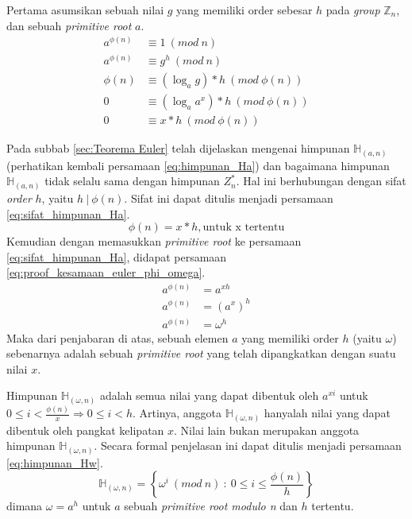 Pertama asumsikan sebuah nilai $ g $ yang memiliki order sebesar $ h $ pada \textit{group} $ \mathbb{Z}_n $, dan sebuah \textit{primitive root} $ a $.
\begin{align}
\label{eq:proof_order_modular_elemen_begin}
a^{\phi(n)} &\equiv 1\ (mod\ n)	\\
a^{\phi(n)} &\equiv g^h\ (mod\ n) \\
\phi(n) &\equiv (\log_a g) * h\ (mod\ \phi(n)) \\
0 &\equiv (\log_a {a^x}) * h\ (mod\ \phi(n)) \\
0 &\equiv x * h\ (mod\ \phi(n))
\label{eq:proof_order_modular_elemen}
\end{align}

Pada subbab \ref{sec:Teorema Euler} telah dijelaskan mengenai himpunan $ \mathbb{H}_{(a, n)} $ (perhatikan kembali persamaan \eqref{eq:himpunan_Ha}) dan bagaimana himpunan $ \mathbb{H}_{(a, n)} $ tidak selalu sama dengan himpunan $ Z_n^* $. Hal ini berhubungan dengan sifat \textit{order} $ h $, yaitu $ h\ |\ \phi(n) $. Sifat ini dapat ditulis menjadi persamaan \eqref{eq:sifat_himpunan_Ha}.
\begin{equation}
\phi(n)=x*h,\text{untuk x tertentu}
\label{eq:sifat_himpunan_Ha}
\end{equation}
Kemudian dengan memasukkan \textit{primitive root} ke persamaan \eqref{eq:sifat_himpunan_Ha}, didapat persamaan \eqref{eq:proof_kesamaan_euler_phi_omega}.
\begin{align}
a^{\phi(n)} &=a^{xh} \\
a^{\phi(n)} &=(a^x)^h \\
a^{\phi(n)} &=\omega^h
\label{eq:proof_kesamaan_euler_phi_omega}
\end{align}
Maka dari penjabaran di atas, sebuah elemen $ a $ yang memiliki order $ h $ (yaitu $\omega$) sebenarnya adalah sebuah \textit{primitive root} yang telah dipangkatkan dengan suatu nilai $ x $.\hfill\eop

Himpunan $ \mathbb{H}_{(\omega, n)} $ adalah semua nilai yang dapat dibentuk oleh $ a^{xi} $ untuk $ 0\leq i < \frac{\phi(n)}{x} \Rightarrow 0\leq i < h $. Artinya, anggota $ \mathbb{H}_{(\omega, n)} $ hanyalah nilai yang dapat dibentuk oleh pangkat kelipatan $ x $. Nilai lain bukan merupakan anggota himpunan $ \mathbb{H}_{(\omega, n)} $. Secara formal penjelasan ini dapat ditulis menjadi persamaan \eqref{eq:himpunan_Hw}.
\begin{equation}
\mathbb{H}_{(\omega,n)}=\left\{\omega^i\ (mod\ n)\ :\ 0 \leq i \leq \frac{\phi(n)}{h}\right\}
\label{eq:himpunan_Hw}
\end{equation}
dimana $ \omega=a^h $ untuk $ a $ sebuah \textit{primitive root modulo n} dan $ h $ tertentu.

